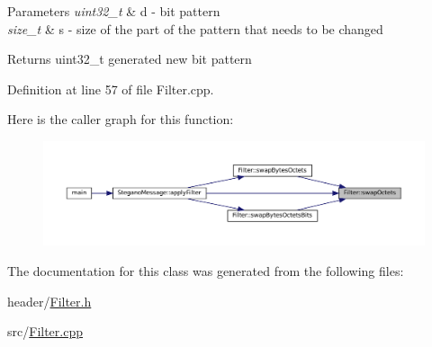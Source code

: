 \begin{DoxyParams}{Parameters}
{\em uint32\+\_\+t} & d -\/ bit pattern \\
\hline
{\em size\+\_\+t} & s -\/ size of the part of the pattern that needs to be changed \\
\hline
\end{DoxyParams}
\begin{DoxyReturn}{Returns}
uint32\+\_\+t generated new bit pattern 
\end{DoxyReturn}


Definition at line 57 of file Filter.\+cpp.

Here is the caller graph for this function\+:
\nopagebreak
\begin{figure}[H]
\begin{center}
\leavevmode
\includegraphics[width=350pt]{classFilter_aeb85c27a3d80540f2bd4b5f314543d4c_icgraph}
\end{center}
\end{figure}


The documentation for this class was generated from the following files\+:\begin{DoxyCompactItemize}
\item 
header/\mbox{\hyperlink{Filter_8h}{Filter.\+h}}\item 
src/\mbox{\hyperlink{Filter_8cpp}{Filter.\+cpp}}\end{DoxyCompactItemize}
